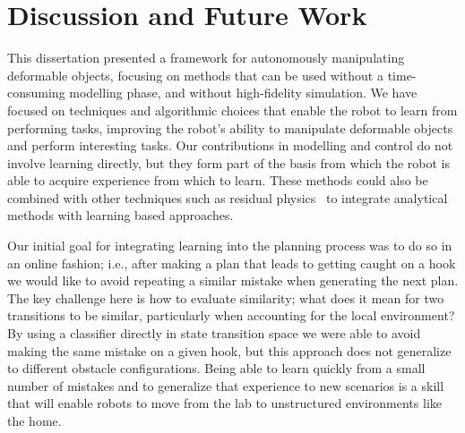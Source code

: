 \chapter{Discussion and Future Work}

This dissertation presented a framework for autonomously manipulating deformable objects, focusing on methods that can be used without a time-consuming modelling phase, and without high-fidelity simulation. We have focused on techniques and algorithmic choices that enable the robot to learn from performing tasks, improving the robot's ability to manipulate deformable objects and perform interesting tasks. Our contributions in modelling and control do not involve learning directly, but they form part of the basis from which the robot is able to acquire experience from which to learn. These methods could also be combined with other techniques such as residual physics~\cite{zengtossingbot} to integrate analytical methods with learning based approaches.

Our initial goal for integrating learning into the planning process was to do so in an online fashion; i.e., after making a plan that leads to getting caught on a hook we would like to avoid repeating a similar mistake when generating the next plan. The key challenge here is how to evaluate similarity; what does it mean for two transitions to be similar, particularly when accounting for the local environment? By using a classifier directly in state transition space we were able to avoid making the same mistake on a given hook, but this approach does not generalize to different obstacle configurations. Being able to learn quickly from a small number of mistakes and to generalize that experience to new scenarios is a skill that will enable robots to move from the lab to unstructured environments like the home.

